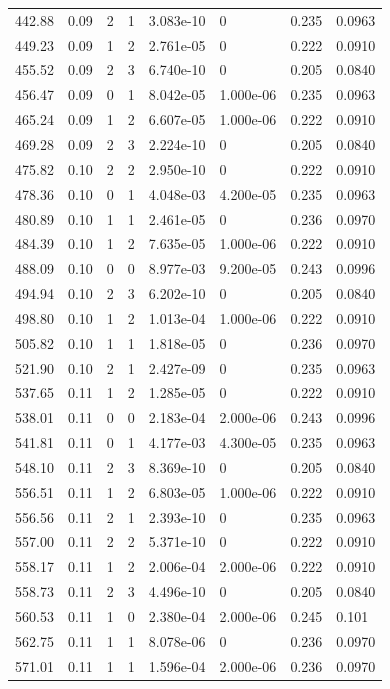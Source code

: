 \documentclass[preview]{standalone}
\begin{document}
{{{\begin{tabular}{L{1.2cm}C{1.2cm} C{0.3cm}C{0.5cm} C{1.4cm}C{1.4cm} C{1.4cm}C{1.4cm}}
  442.88  &  0.09  & 2     &  1 &  3.083e-10  & 0  & 0.235 &  0.0963   \\ 
  449.23  &  0.09  & 1     &  2 &  2.761e-05  & 0  & 0.222 &  0.0910   \\ 
  455.52  &  0.09  & 2     &  3 &  6.740e-10  & 0  & 0.205 &  0.0840   \\ 
  456.47  &  0.09  & 0     &  1 &  8.042e-05  & 1.000e-06  & 0.235 &  0.0963   \\ 
  465.24  &  0.09  & 1     &  2 &  6.607e-05  & 1.000e-06  & 0.222 &  0.0910   \\ 
  469.28  &  0.09  & 2     &  3 &  2.224e-10  & 0  & 0.205 &  0.0840   \\ 
  475.82  &  0.10  & 2     &  2 &  2.950e-10  & 0  & 0.222 &  0.0910   \\ 
  478.36  &  0.10  & 0     &  1 &  4.048e-03  & 4.200e-05  & 0.235 &  0.0963   \\ 
  480.89  &  0.10  & 1     &  1 &  2.461e-05  & 0  & 0.236 &  0.0970   \\ 
  484.39  &  0.10  & 1     &  2 &  7.635e-05  & 1.000e-06  & 0.222 &  0.0910   \\ 
  488.09  &  0.10  & 0     &  0 &  8.977e-03  & 9.200e-05  & 0.243 &  0.0996   \\ 
  494.94  &  0.10  & 2     &  3 &  6.202e-10  & 0  & 0.205 &  0.0840   \\ 
  498.80  &  0.10  & 1     &  2 &  1.013e-04  & 1.000e-06  & 0.222 &  0.0910   \\ 
  505.82  &  0.10  & 1     &  1 &  1.818e-05  & 0  & 0.236 &  0.0970   \\ 
  521.90  &  0.10  & 2     &  1 &  2.427e-09  & 0  & 0.235 &  0.0963   \\ 
  537.65  &  0.11  & 1     &  2 &  1.285e-05  & 0  & 0.222 &  0.0910   \\ 
  538.01  &  0.11  & 0     &  0 &  2.183e-04  & 2.000e-06  & 0.243 &  0.0996   \\ 
  541.81  &  0.11  & 0     &  1 &  4.177e-03  & 4.300e-05  & 0.235 &  0.0963   \\ 
  548.10  &  0.11  & 2     &  3 &  8.369e-10  & 0  & 0.205 &  0.0840   \\ 
  556.51  &  0.11  & 1     &  2 &  6.803e-05  & 1.000e-06  & 0.222 &  0.0910   \\ 
  556.56  &  0.11  & 2     &  1 &  2.393e-10  & 0  & 0.235 &  0.0963   \\ 
  557.00  &  0.11  & 2     &  2 &  5.371e-10  & 0  & 0.222 &  0.0910   \\ 
  558.17  &  0.11  & 1     &  2 &  2.006e-04  & 2.000e-06  & 0.222 &  0.0910   \\ 
  558.73  &  0.11  & 2     &  3 &  4.496e-10  & 0  & 0.205 &  0.0840   \\ 
  560.53  &  0.11  & 1     &  0 &  2.380e-04  & 2.000e-06  & 0.245 &  0.101   \\ 
  562.75  &  0.11  & 1     &  1 &  8.078e-06  & 0  & 0.236 &  0.0970   \\ 
  571.01  &  0.11  & 1     &  1 &  1.596e-04  & 2.000e-06  & 0.236 &  0.0970   \\ 
\hline 
\end{tabular} 

}}}
\end{document}
